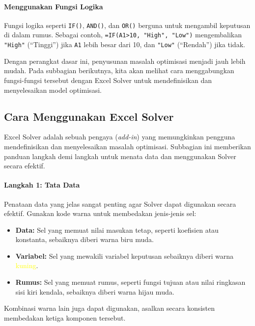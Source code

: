 \paragraph{Menggunakan Fungsi Logika}

Fungsi logika seperti \texttt{IF()}, \texttt{AND()}, dan \texttt{OR()} berguna untuk mengambil keputusan di dalam rumus. Sebagai contoh, \texttt{=IF(A1>10, "High", "Low")} mengembalikan \texttt{"High"} (``Tinggi'') jika \texttt{A1} lebih besar dari 10, dan \texttt{"Low"} (``Rendah'') jika tidak.

Dengan perangkat dasar ini, penyusunan masalah optimisasi menjadi jauh lebih mudah. Pada subbagian berikutnya, kita akan melihat cara menggabungkan fungsi-fungsi tersebut dengan Excel Solver untuk mendefinisikan dan menyelesaikan model optimisasi.

\subsection{Cara Menggunakan Excel Solver}

Excel Solver adalah sebuah pengaya (\emph{add-in}) yang memungkinkan pengguna mendefinisikan dan menyelesaikan masalah optimisasi. Subbagian ini memberikan panduan langkah demi langkah untuk menata data dan menggunakan Solver secara efektif.

\paragraph{Langkah 1: Tata Data}
Penataan data yang jelas sangat penting agar Solver dapat digunakan secara efektif. Gunakan kode warna untuk membedakan jenis-jenis sel:
\begin{itemize}
    \item \textbf{Data:} Sel yang memuat nilai masukan tetap, seperti koefisien atau konstanta, sebaiknya diberi warna \textcolor{blue!50!white}{biru muda}.
    \item \textbf{Variabel:} Sel yang mewakili variabel keputusan sebaiknya diberi warna \textcolor{yellow}{kuning}.
        \item \textbf{Rumus:} Sel yang memuat rumus, seperti fungsi tujuan atau nilai ringkasan sisi kiri kendala, sebaiknya diberi warna \textcolor{green!50!white}{hijau muda}.
\end{itemize}
Kombinasi warna lain juga dapat digunakan, asalkan secara konsisten membedakan ketiga komponen tersebut.

{\centering
{}\par{}\label{fig:excel-solver-layout}%
\par}

